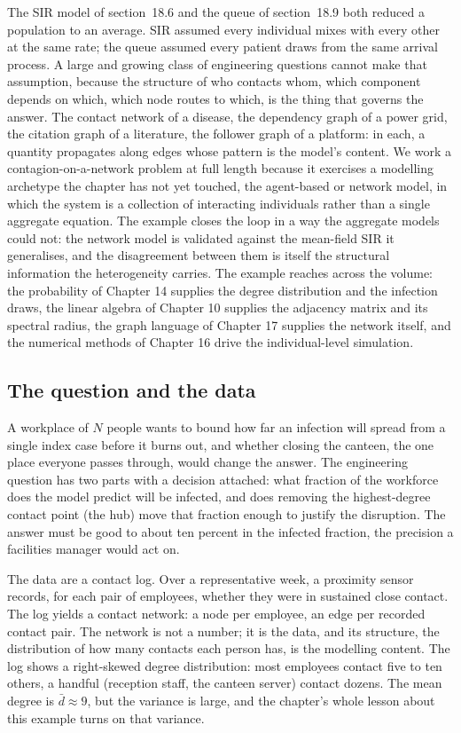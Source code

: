 The SIR model of section~18.6 and the queue of section~18.9 both reduced a
population to an average. SIR assumed every individual mixes with every
other at the same rate; the queue assumed every patient draws from the same
arrival process. A large and growing class of engineering questions cannot
make that assumption, because the structure of who contacts whom, which
component depends on which, which node routes to which, is the thing that
governs the answer. The contact network of a disease, the dependency graph
of a power grid, the citation graph of a literature, the follower graph of
a platform: in each, a quantity propagates along edges whose pattern is the
model's content. We work a contagion-on-a-network problem at full length
because it exercises a modelling archetype the chapter has not yet touched,
the agent-based or network model, in which the system is a collection of
interacting individuals rather than a single aggregate equation. The
example closes the loop in a way the aggregate models could not: the
network model is validated against the mean-field SIR it generalises, and
the disagreement between them is itself the structural information the
heterogeneity carries. The example reaches across the volume: the
probability of Chapter 14 supplies the degree distribution and the
infection draws, the linear algebra of Chapter 10 supplies the adjacency
matrix and its spectral radius, the graph language of Chapter 17 supplies
the network itself, and the numerical methods of Chapter 16 drive the
individual-level simulation.

\subsection{The question and the data}

A workplace of $N$ people wants to bound how far an infection will spread
from a single index case before it burns out, and whether closing the
canteen, the one place everyone passes through, would change the answer.
The engineering question has two parts with a decision attached: what
fraction of the workforce does the model predict will be infected, and does
removing the highest-degree contact point (the hub) move that fraction
enough to justify the disruption. The answer must be good to about ten
percent in the infected fraction, the precision a facilities manager would
act on.

The data are a contact log. Over a representative week, a proximity sensor
records, for each pair of employees, whether they were in sustained close
contact. The log yields a contact network: a node per employee, an edge
per recorded contact pair. The network is not a number; it is the data, and
its structure, the distribution of how many contacts each person has, is
the modelling content. The log shows a right-skewed degree distribution: most
employees contact five to ten others, a handful (reception staff, the
canteen server) contact dozens. The mean degree is $\bar{d} \approx 9$,
but the variance is large, and the chapter's whole lesson about this
example turns on that variance.

